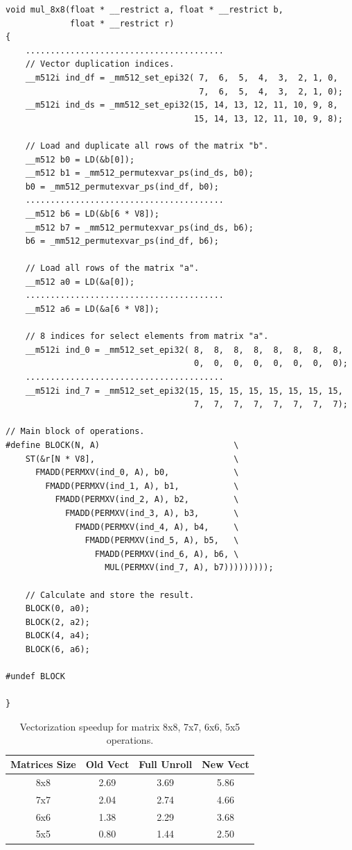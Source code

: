 \documentclass[
11pt,%
tightenlines,%
twoside,%
onecolumn,%
nofloats,%
nobibnotes,%
nofootinbib,%
superscriptaddress,%
noshowpacs,%
centertags]%
{revtex4}
\begin{document}
\begin{lstlisting}
void mul_8x8(float * __restrict a, float * __restrict b,
             float * __restrict r)
{
    ........................................
    // Vector duplication indices.
    __m512i ind_df = _mm512_set_epi32( 7,  6,  5,  4,  3,  2, 1, 0,
                                       7,  6,  5,  4,  3,  2, 1, 0);
    __m512i ind_ds = _mm512_set_epi32(15, 14, 13, 12, 11, 10, 9, 8,
                                      15, 14, 13, 12, 11, 10, 9, 8);

    // Load and duplicate all rows of the matrix "b".
    __m512 b0 = LD(&b[0]);
    __m512 b1 = _mm512_permutexvar_ps(ind_ds, b0);
    b0 = _mm512_permutexvar_ps(ind_df, b0);
    ........................................
    __m512 b6 = LD(&b[6 * V8]);
    __m512 b7 = _mm512_permutexvar_ps(ind_ds, b6);
    b6 = _mm512_permutexvar_ps(ind_df, b6);

    // Load all rows of the matrix "a".
    __m512 a0 = LD(&a[0]);
    ........................................
    __m512 a6 = LD(&a[6 * V8]);

    // 8 indices for select elements from matrix "a".
    __m512i ind_0 = _mm512_set_epi32( 8,  8,  8,  8,  8,  8,  8,  8,
                                      0,  0,  0,  0,  0,  0,  0,  0);
    ........................................
    __m512i ind_7 = _mm512_set_epi32(15, 15, 15, 15, 15, 15, 15, 15,
                                      7,  7,  7,  7,  7,  7,  7,  7);

// Main block of operations.
#define BLOCK(N, A)                           \
    ST(&r[N * V8],                            \
      FMADD(PERMXV(ind_0, A), b0,             \
        FMADD(PERMXV(ind_1, A), b1,           \
          FMADD(PERMXV(ind_2, A), b2,         \
            FMADD(PERMXV(ind_3, A), b3,       \
              FMADD(PERMXV(ind_4, A), b4,     \
                FMADD(PERMXV(ind_5, A), b5,   \
                  FMADD(PERMXV(ind_6, A), b6, \
                    MUL(PERMXV(ind_7, A), b7)))))))));

    // Calculate and store the result.
    BLOCK(0, a0);
    BLOCK(2, a2);
    BLOCK(4, a4);
    BLOCK(6, a6);

#undef BLOCK

}
\end{lstlisting}

\begin{table}[!h]
\setcaptionmargin{0mm}
\onelinecaptionsfalse
{}
\caption{Vectorization speedup for matrix 8x8, 7x7, 6x6, 5x5 operations.}
\bigskip
\begin{tabular}{|c|c|c|c|}
\hline
\textbf{Matrices Size} & \textbf{Old Vect} & \textbf{Full Unroll} & \textbf{New Vect} \\
\hline
8x8 & 2.69 & 3.69 & 5.86 \\
7x7 & 2.04 & 2.74 & 4.66 \\
6x6 & 1.38 & 2.29 & 3.68 \\
5x5 & 0.80 & 1.44 & 2.50 \\
\hline
\end{tabular}
\end{table}
\end{document}
